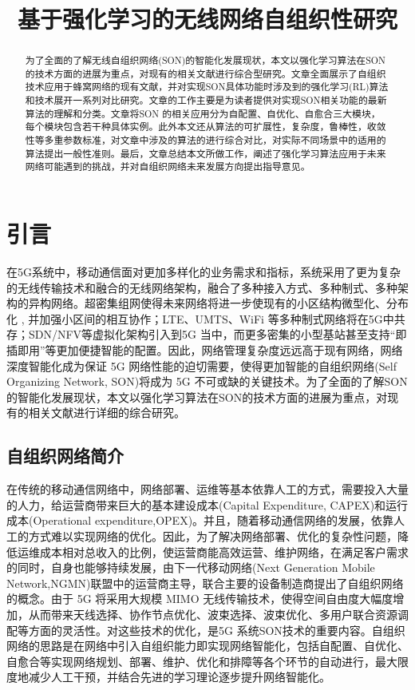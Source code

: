 \documentclass{IEEEtran}
\begin{document}
\title{基于强化学习的无线网络自组织性研究}
\maketitle

\begin{abstract}
为了全面的了解无线自组织网络(SON)的智能化发展现状，本文以强化学习算法在SON的技术方面的进展为重点，对现有的相关文献进行综合型研究。文章全面展示了自组织技术应用于蜂窝网络的现有文献，并对实现SON具体功能时涉及到的强化学习(RL)算法和技术展开一系列对比研究。文章的工作主要是为读者提供对实现SON相关功能的最新算法的理解和分类。文章将SON 的相关应用分为自配置、自优化、自愈合三大模块，每个模块包含若干种具体实例。此外本文还从算法的可扩展性，复杂度，鲁棒性，收敛性等多重参数标准，对文章中涉及的算法的进行综合对比，对实际不同场景中的适用的算法提出一般性准则。最后，文章总结本文所做工作，阐述了强化学习算法应用于未来网络可能遇到的挑战，并对自组织网络未来发展方向提出指导意见。
\end{abstract}

\section{引言}
在5G系统中，移动通信面对更加多样化的业务需求和指标，系统采用了更为复杂的无线传输技术和融合的无线网络架构，融合了多种接入方式、多种制式、多种架构的异构网络。超密集组网使得未来网络将进一步使现有的小区结构微型化、分布化 , 并加强小区间的相互协作；LTE、UMTS、WiFi 等多种制式网络将在5G中共存；SDN/NFV等虚拟化架构引入到5G 当中，而更多密集的小型基站甚至支持“即插即用”等更加便捷智能的配置。因此，网络管理复杂度远远高于现有网络，网络深度智能化成为保证 5G 网络性能的迫切需要，使得更加智能的自组织网络(Self Organizing Network, SON)将成为 5G 不可或缺的关键技术。为了全面的了解SON的智能化发展现状，本文以强化学习算法在SON的技术方面的进展为重点，对现有的相关文献进行详细的综合研究。

\subsection{自组织网络简介}


在传统的移动通信网络中，网络部署、运维等基本依靠人工的方式，需要投入大量的人力，给运营商带来巨大的基本建设成本(Capital Expenditure, CAPEX)和运行成本(Operational expenditure,OPEX)。并且，随着移动通信网络的发展，依靠人工的方式难以实现网络的优化。因此，为了解决网络部署、优化的复杂性问题，降低运维成本相对总收入的比例，使运营商能高效运营、维护网络，在满足客户需求的同时，自身也能够持续发展，由下一代移动网络(Next Generation Mobile Network,NGMN)联盟中的运营商主导，联合主要的设备制造商提出了自组织网络的概念\cite{Alliance2008}。由于 5G 将采用大规模 MIMO 无线传输技术，使得空间自由度大幅度增加，从而带来天线选择、协作节点优化、波束选择、波束优化、多用户联合资源调配等方面的灵活性。对这些技术的优化，是5G 系统SON技术的重要内容。自组织网络的思路是在网络中引入自组织能力即实现网络智能化，包括自配置、自优化、自愈合等实现网络规划、部署、维护、优化和排障等各个环节的自动进行，最大限度地减少人工干预，并结合先进的学习理论逐步提升网络智能化。
\end{document}

